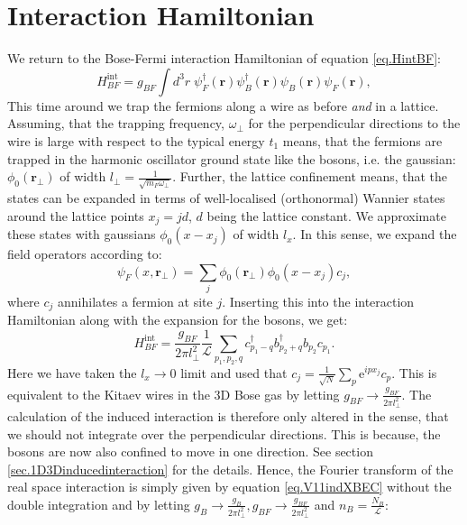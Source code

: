 \section{Interaction Hamiltonian} \label{sec.interaction.lattice}
We return to the Bose-Fermi interaction Hamiltonian of equation \eqref{eq.HintBF}:
\begin{equation}
H_{BF}^\text{int} = g_{BF}\int d^3 r \; \psi_F^\dagger(\mathbf{r}) \psi_B^\dagger(\mathbf{r})\psi_B(\mathbf{r})\psi_F(\mathbf{r}),
\end{equation} 
This time around we trap the fermions along a wire as before \textit{and} in a lattice. Assuming, that the trapping frequency, $\omega_{\perp}$ for the perpendicular directions to the wire is large with respect to the typical energy $t_1$ means, that the fermions are trapped in the harmonic oscillator ground state like the bosons, i.e. the gaussian: $\phi_0(\mathbf{r}_{\perp})$ of width $l_{\perp} = \frac{1}{\sqrt{m_F\omega_{\perp}}}$. Further, the lattice confinement means, that the states can be expanded in terms of well-localised (orthonormal) Wannier states around the lattice points $x_j = jd$, $d$ being the lattice constant. We approximate these states with gaussians $\phi_0(x - x_j)$ of width $l_x$. In this sense, we expand the field operators according to:
\begin{equation}
\psi_F(x, \mathbf{r}_{\perp}) = \sum_j \phi_0(\mathbf{r}_{\perp})\phi_0(x - x_j) c_j, 
\end{equation}
where $c_j$ annihilates a fermion at site $j$. Inserting this into the interaction Hamiltonian along with the expansion for the bosons, we get:
\begin{equation}
H_{BF}^{\text{int}} = \frac{g_{BF}}{2\pi l_{\perp}^2}\frac{1}{\mathcal{L}}\sum_{p_1, p_2, q} c^\dagger_{p_1 - q}b^\dagger_{p_2 + q}b_{p_2}c_{p_1}. \nonumber
\end{equation}
Here we have taken the $l_x \to 0$ limit and used that $c_j = \frac{1}{\sqrt{N}}\sum_p \text{e}^{ipx_j}c_p$. This is equivalent to the Kitaev wires in the 3D Bose gas by letting $g_{BF} \to \frac{g_{BF}}{2\pi l_{\perp}^2}$. The calculation of the induced interaction is therefore only altered in the sense, that we should not integrate over the perpendicular directions. This is because, the bosons are now also confined to move in one direction. See section \ref{sec.1D3Dinducedinteraction} for the details. Hence, the Fourier transform of the real space interaction is simply given by equation \eqref{eq.V11indXBEC} without the double integration and by letting $g_B \to \frac{g_B}{2\pi l_{\perp}^2}, g_{BF} \to \frac{g_{BF}}{2\pi l_{\perp}^2}$ and $n_B = \frac{N_B}{\mathcal{L}}$:
